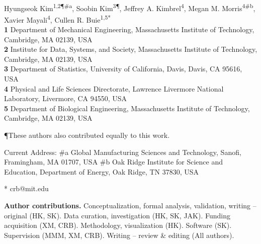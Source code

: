 \documentclass[10pt,letterpaper]{article}
\newcommand{\1}{{\rm 1}\kern-0.24em{\rm I}}
\begin{document}
\vspace*{0.2in}

\begin{flushleft}
{\Large
\textbf{}
}
\newline
\\
Hyungseok Kim\textsuperscript{1,2\P \#\!a},
Soobin Kim\textsuperscript{3\P},
Jeffrey A. Kimbrel\textsuperscript{4},
Megan M. Morris\textsuperscript{4\#\!b},
Xavier Mayali\textsuperscript{4},
Cullen R. Buie\textsuperscript{1,5*}
\\
\bigskip
\textbf{1} Department of Mechanical Engineering, Massachusetts Institute of Technology, Cambridge, MA 02139, USA
\\
\textbf{2} Institute for Data, Systems, and Society, Massachusetts Institute of Technology, Cambridge, MA 02139, USA
\\
\textbf{3} Department of Statistics, University of California, Davis, Davis, CA 95616, USA
\\
\textbf{4} Physical and Life Sciences Directorate, Lawrence Livermore National Laboratory, Livermore, CA 94550, USA
\\
\textbf{5} Department of Biological Engineering, Massachusetts Institute of Technology, Cambridge, MA 02139, USA
\\
\bigskip

\P These authors also contributed equally to this work.

Current Address: \#\!a Global Manufacturing Sciences and Technology, Sanofi, Framingham, MA 01707, USA
\#\!b Oak Ridge Institute for Science and Education, Department of Energy, Oak Ridge, TN 37830, USA 

* crb@mit.edu

\textbf{Author contributions.} Conceptualization, formal analysis, validation, writing – original (HK, SK). Data curation, investigation (HK, SK, JAK). Funding acquisition (XM, CRB). Methodology, visualization (HK). Software (SK). Supervision (MMM, XM, CRB).  Writing – review \& editing (All authors).

\end{flushleft}
\end{document}
